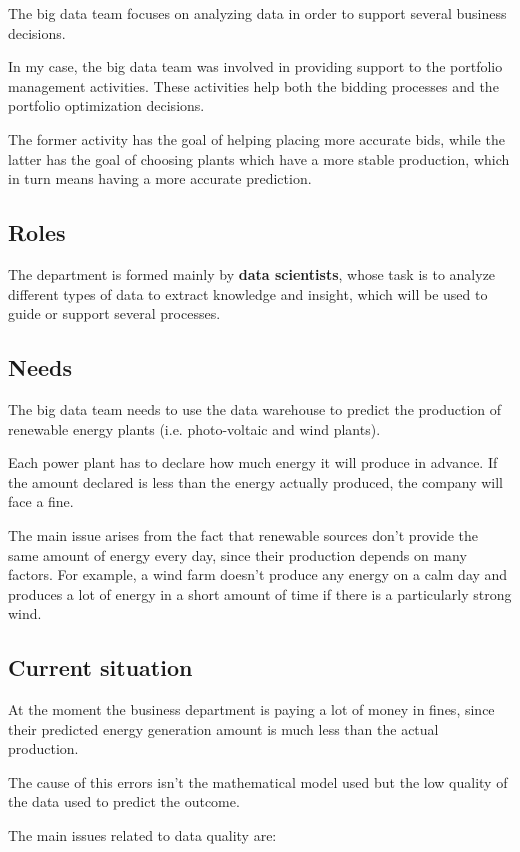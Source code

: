 The big data team focuses on analyzing data in order to support several business decisions.

In my case, the big data team was involved in providing support to the portfolio management activities.
These activities help both the bidding processes and the portfolio optimization decisions.

The former activity has the goal of helping placing more accurate bids, while the latter has the goal of choosing plants which have a more stable production, which in turn means having a more accurate prediction.

\subsection{Roles}
    The department is formed mainly by \textbf{data scientists}, whose task is to analyze different types of data to extract knowledge and insight, which will be used to guide or support several processes.
    
\subsection{Needs}
    The big data team needs to use the data warehouse to predict the production of renewable energy plants (i.e. photo-voltaic and wind plants).
    
    Each power plant has to declare how much energy it will produce in advance.
    If the amount declared is less than the energy actually produced, the company will face a fine.
    
    The main issue arises from the fact that renewable sources don't provide the same amount of energy every day, since their production depends on many factors.
    For example, a wind farm doesn't produce any energy on a calm day and produces a lot of energy in a short amount of time if there is a particularly strong wind.
    
\subsection{Current situation}
    \reword At the moment the business department is paying a lot of money in fines, since their predicted energy generation amount is much less than the actual production.
    
    The cause of this errors isn't the mathematical model used but the low quality of the data used to predict the outcome.
    
    The main issues related to data quality are:
